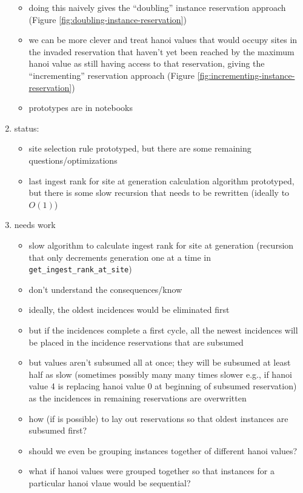 \begin{enumerate}
\begin{itemize}
  \item doing this naively gives the ``doubling'' instance reservation approach (Figure \ref{fig:doubling-instance-reservation})
  \item we can be more clever and treat hanoi values that would occupy sites in the invaded reservation that haven't yet been reached by the maximum hanoi value as still having access to that reservation, giving the ``incrementing'' reservation approach (Figure \ref{fig:incrementing-instance-reservation})
  \item prototypes are in notebooks
\end{itemize}
\item status:
\begin{itemize}
  \item site selection rule prototyped, but there are some remaining questions/optimizations
  \item last ingest rank for site at generation calculation algorithm prototyped, but there is some slow recursion that needs to be rewritten (ideally to $O(1)$)
\end{itemize}
\item needs work
\begin{itemize}
  \item slow algorithm to calculate ingest rank for site at generation (recursion that only decrements generation one at a time in \texttt{get\_ingest\_rank\_at\_site})
  \item don't understand the consequences/know
  \item ideally, the oldest incidences would be eliminated first
  \item but if the incidences complete a first cycle, all the newest incidences will be placed in the incidence reservations that are subsumed
  \item but values aren't subsumed all at once; they will be subsumed at least half as slow (sometimes possibly many many times slower e.g., if hanoi value 4 is replacing hanoi value 0 at beginning of subsumed reservation) as the incidences in remaining reservations are overwritten
  \item how (if is possible) to lay out reservations so that oldest instances are subsumed first?
  \item should we even be grouping instances together of different hanoi values?
  \item what if hanoi values were grouped together so that instances for a particular hanoi vlaue would be sequential?
\end{itemize}
\end{enumerate}
